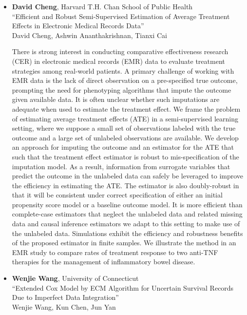 \begin{itemize}
\item \textbf{David Cheng}, Harvard T.H. Chan School of Public Health \\
``Efficient and Robust Semi-Supervised Estimation of Average Treatment Effects in Electronic Medical Records Data'' \\
David Cheng, Ashwin Ananthakrishnan, Tianxi Cai


There is strong interest in conducting comparative effectiveness research (CER) in electronic medical records (EMR) data to evaluate treatment strategies among real-world patients.  A primary challenge of working with EMR data is the lack of direct observation on a pre-specified true outcome, prompting the need for phenotyping algorithms that impute the outcome given available data.  It is often unclear whether such imputations are adequate when used to estimate the treatment effect.  We frame the problem of estimating average treatment effects (ATE) in a semi-supervised learning setting, where we suppose a small set of observations labeled with the true outcome and a large set of unlabeled observations are available.  We develop an approach for imputing the outcome and an estimator for the ATE that such that the treatment effect estimator is robust to mis-specification of the imputation model. As a result, information from surrogate variables that predict the outcome in the unlabeled data can safely be leveraged to improve the efficiency in estimating the ATE.  The estimator is also doubly-robust in that it will be consistent under correct specification of either an initial propensity score model or a baseline outcome model.  It is more efficient than complete-case estimators that neglect the unlabeled data and related missing data and causal inference estimators we adapt to this setting to make use of the unlabeled data.  Simulations exhibit the efficiency and robustness benefits of the proposed estimator in finite samples.  We illustrate the method in an EMR study to compare rates of treatment response to two anti-TNF therapies for the management of inflammatory bowel disease.

\item \textbf{Wenjie Wang}, University of Connecticut \\
``Extended Cox Model by ECM Algorithm for Uncertain Survival Records Due  to Imperfect Data Integration'' \\
Wenjie Wang, Kun Chen, Jun Yan



\end{itemize}
